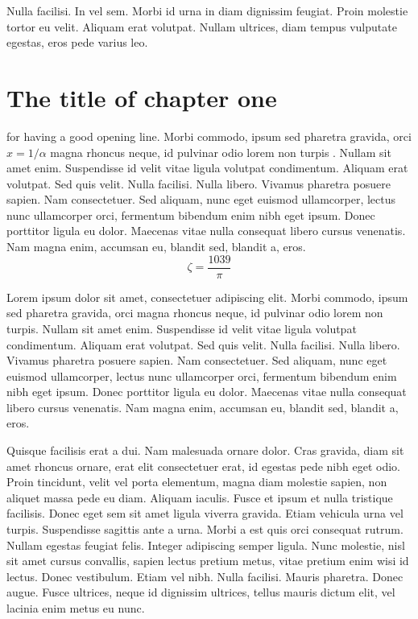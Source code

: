 \begin{savequote}[75mm] Nulla facilisi. In vel sem. Morbi id urna in diam
	dignissim feugiat. Proin molestie tortor eu velit. Aliquam erat
	volutpat. Nullam ultrices, diam tempus vulputate egestas, eros pede
	varius leo.   \end{savequote}

\chapter{The title of chapter one}

 for having a good opening line. Morbi
commodo, ipsum sed pharetra gravida, orci  $x = 1/\alpha$ magna rhoncus neque,
id pulvinar odio lorem non turpis \cite{Eigen1971, Knuth1968}. Nullam sit amet
enim. Suspendisse id velit vitae ligula volutpat condimentum. Aliquam erat
volutpat. Sed quis velit. Nulla facilisi. Nulla libero. Vivamus pharetra
posuere sapien. Nam consectetuer. Sed aliquam, nunc eget euismod ullamcorper,
lectus nunc ullamcorper orci, fermentum bibendum enim nibh eget ipsum. Donec
porttitor ligula eu dolor. Maecenas vitae nulla consequat libero cursus
venenatis. Nam magna enim, accumsan eu, blandit sed, blandit a, eros.  $$\zeta
= \frac{1039}{\pi}$$



Lorem ipsum dolor sit amet, consectetuer adipiscing elit. Morbi commodo, ipsum
sed pharetra gravida, orci magna rhoncus neque, id pulvinar odio lorem non
turpis. Nullam sit amet enim. Suspendisse id velit vitae ligula volutpat
condimentum. Aliquam erat volutpat. Sed quis velit. Nulla facilisi. Nulla
libero. Vivamus pharetra posuere sapien. Nam consectetuer. Sed aliquam, nunc
eget euismod ullamcorper, lectus nunc ullamcorper orci, fermentum bibendum enim
nibh eget ipsum. Donec porttitor ligula eu dolor. Maecenas vitae nulla
consequat libero cursus venenatis. Nam magna enim, accumsan eu, blandit sed,
blandit a, eros.

Quisque facilisis erat a dui. Nam malesuada ornare dolor. Cras gravida, diam
sit amet rhoncus ornare, erat elit consectetuer erat, id egestas pede nibh eget
odio. Proin tincidunt, velit vel porta elementum, magna diam molestie sapien,
non aliquet massa pede eu diam. Aliquam iaculis. Fusce et ipsum et nulla
tristique facilisis. Donec eget sem sit amet ligula viverra gravida. Etiam
vehicula urna vel turpis. Suspendisse sagittis ante a urna. Morbi a est quis
orci consequat rutrum. Nullam egestas feugiat felis. Integer adipiscing semper
ligula. Nunc molestie, nisl sit amet cursus convallis, sapien lectus pretium
metus, vitae pretium enim wisi id lectus. Donec vestibulum. Etiam vel nibh.
Nulla facilisi. Mauris pharetra. Donec augue. Fusce ultrices, neque id
dignissim ultrices, tellus mauris dictum elit, vel lacinia enim metus eu nunc.

